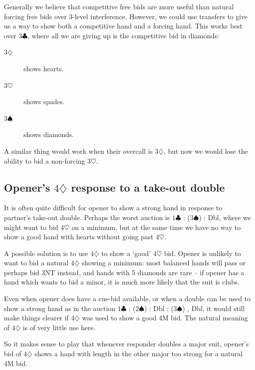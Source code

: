 \documentclass{article}
\newcommand{\sz}{\spadesuit}
\newcommand{\hz}{\heartsuit}
\newcommand{\dz}{\diamondsuit}
\newcommand{\cz}{\clubsuit}
\begin{document}
Generally we believe that competitive free bids are more useful than natural forcing free bids over 3-level interference. However, we could use transfers to give us a way to show both a competitive hand and a forcing hand. This works best over $3\cz$, where all we are giving up is the competitive bid in diamonds:

\begin{description}
\item[3$\dz$] shows hearts.
\item[3$\hz$] shows spades.
\item[3$\sz$] shows diamonds.
\end{description}

A similar thing would work when their overcall is $3\dz$, but now we would lose the ability to bid a non-forcing $3\hz$.

\subsection{Opener's $4\dz$ response to a take-out double}

It is often quite difficult for opener to show a strong hand in response to partner's take-out double. Perhaps the worst auction is $1\cz$ : ($3\sz$) : Dbl, where we might want to bid $4\hz$ on a minimum, but at the same time we have no way to show a good hand with hearts without going past $4\hz$.

A possible solution is to use $4\dz$ to show a `good' $4\hz$ bid. Opener is unlikely to want to bid a natural $4\dz$ showing a minimum: most balanced hands will pass or perhaps bid 3NT instead, and hands with 5 diamonds are rare -- if opener has a hand which wants to bid a minor, it is much more likely that the suit is clubs.

Even when opener does have a cue-bid available, or when a double can be used to show a strong hand as in the auction $1\cz$ : ($2\sz$) : Dbl : ($3\sz$) , Dbl, it would still make things clearer if $4\dz$ was used to show a good 4M bid. The natural meaning of $4\dz$ is of very little use here.

So it makes sense to play that whenever responder doubles a major suit, opener's bid of $4\dz$ shows a hand with length in the other major too strong for a natural 4M bid.
\end{document}
